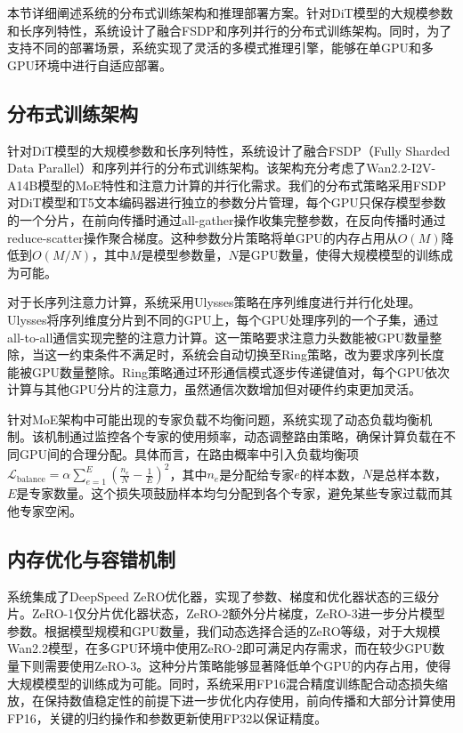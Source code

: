 本节详细阐述系统的分布式训练架构和推理部署方案。针对DiT模型的大规模参数和长序列特性，系统设计了融合FSDP和序列并行的分布式训练架构。同时，为了支持不同的部署场景，系统实现了灵活的多模式推理引擎，能够在单GPU和多GPU环境中进行自适应部署。

\subsection{分布式训练架构}

针对DiT模型的大规模参数和长序列特性，系统设计了融合FSDP（Fully Sharded Data Parallel）和序列并行的分布式训练架构。该架构充分考虑了Wan2.2-I2V-A14B模型的MoE特性和注意力计算的并行化需求。我们的分布式策略采用FSDP对DiT模型和T5文本编码器进行独立的参数分片管理，每个GPU只保存模型参数的一个分片，在前向传播时通过all-gather操作收集完整参数，在反向传播时通过reduce-scatter操作聚合梯度。这种参数分片策略将单GPU的内存占用从$O(M)$降低到$O(M/N)$，其中$M$是模型参数量，$N$是GPU数量，使得大规模模型的训练成为可能。

对于长序列注意力计算，系统采用Ulysses策略在序列维度进行并行化处理。Ulysses将序列维度分片到不同的GPU上，每个GPU处理序列的一个子集，通过all-to-all通信实现完整的注意力计算。这一策略要求注意力头数能被GPU数量整除，当这一约束条件不满足时，系统会自动切换至Ring策略，改为要求序列长度能被GPU数量整除。Ring策略通过环形通信模式逐步传递键值对，每个GPU依次计算与其他GPU分片的注意力，虽然通信次数增加但对硬件约束更加灵活。

针对MoE架构中可能出现的专家负载不均衡问题，系统实现了动态负载均衡机制。该机制通过监控各个专家的使用频率，动态调整路由策略，确保计算负载在不同GPU间的合理分配。具体而言，在路由概率中引入负载均衡项$\mathcal{L}_{\text{balance}} = \alpha \sum_{e=1}^E (\frac{n_e}{N} - \frac{1}{E})^2$，其中$n_e$是分配给专家$e$的样本数，$N$是总样本数，$E$是专家数量。这个损失项鼓励样本均匀分配到各个专家，避免某些专家过载而其他专家空闲。

\subsection{内存优化与容错机制}

系统集成了DeepSpeed ZeRO优化器，实现了参数、梯度和优化器状态的三级分片。ZeRO-1仅分片优化器状态，ZeRO-2额外分片梯度，ZeRO-3进一步分片模型参数。根据模型规模和GPU数量，我们动态选择合适的ZeRO等级，对于大规模Wan2.2模型，在多GPU环境中使用ZeRO-2即可满足内存需求，而在较少GPU数量下则需要使用ZeRO-3。这种分片策略能够显著降低单个GPU的内存占用，使得大规模模型的训练成为可能。同时，系统采用FP16混合精度训练配合动态损失缩放，在保持数值稳定性的前提下进一步优化内存使用，前向传播和大部分计算使用FP16，关键的归约操作和参数更新使用FP32以保证精度。

